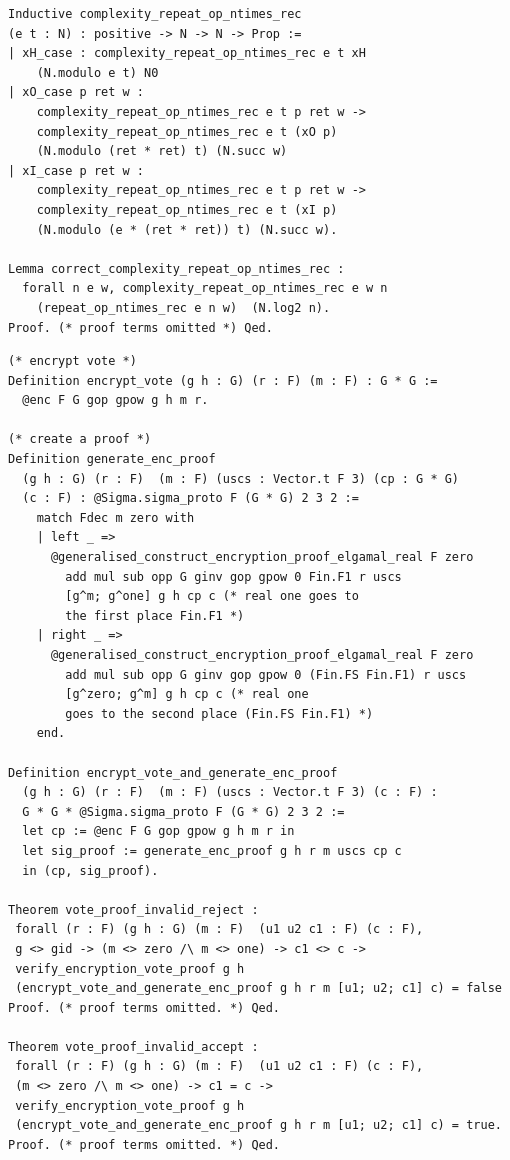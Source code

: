 \documentclass[sigconf,anonymous,review]{acmart}
\begin{document}
\begin{lstlisting}[frame=single, language=Coq, caption={Extractor Complexity},
  label={extractor_complex},captionpos=t, basicstyle=\ttfamily\footnotesize,
  abovecaptionskip=-\medskipamount]
Inductive complexity_repeat_op_ntimes_rec 
(e t : N) : positive -> N -> N -> Prop :=
| xH_case : complexity_repeat_op_ntimes_rec e t xH 
    (N.modulo e t) N0
| xO_case p ret w : 
    complexity_repeat_op_ntimes_rec e t p ret w ->
    complexity_repeat_op_ntimes_rec e t (xO p) 
    (N.modulo (ret * ret) t) (N.succ w)
| xI_case p ret w : 
    complexity_repeat_op_ntimes_rec e t p ret w ->
    complexity_repeat_op_ntimes_rec e t (xI p) 
    (N.modulo (e * (ret * ret)) t) (N.succ w).

Lemma correct_complexity_repeat_op_ntimes_rec : 
  forall n e w, complexity_repeat_op_ntimes_rec e w n 
    (repeat_op_ntimes_rec e n w)  (N.log2 n).
Proof. (* proof terms omitted *) Qed.
\end{lstlisting}

\begin{lstlisting}[frame=single, language=Coq, caption={Frontend Functions},
  label={frontend_fun},captionpos=t, basicstyle=\ttfamily\footnotesize,
  abovecaptionskip=-\medskipamount]
(* encrypt vote *)
Definition encrypt_vote (g h : G) (r : F) (m : F) : G * G :=
  @enc F G gop gpow g h m r.

(* create a proof *)
Definition generate_enc_proof 
  (g h : G) (r : F)  (m : F) (uscs : Vector.t F 3) (cp : G * G) 
  (c : F) : @Sigma.sigma_proto F (G * G) 2 3 2 :=
    match Fdec m zero with 
    | left _ => 
      @generalised_construct_encryption_proof_elgamal_real F zero 
        add mul sub opp G ginv gop gpow 0 Fin.F1 r uscs 
        [g^m; g^one] g h cp c (* real one goes to 
        the first place Fin.F1 *)
    | right _ =>  
      @generalised_construct_encryption_proof_elgamal_real F zero 
        add mul sub opp G ginv gop gpow 0 (Fin.FS Fin.F1) r uscs 
        [g^zero; g^m] g h cp c (* real one 
        goes to the second place (Fin.FS Fin.F1) *)
    end.

Definition encrypt_vote_and_generate_enc_proof 
  (g h : G) (r : F)  (m : F) (uscs : Vector.t F 3) (c : F) : 
  G * G * @Sigma.sigma_proto F (G * G) 2 3 2 := 
  let cp := @enc F G gop gpow g h m r in
  let sig_proof := generate_enc_proof g h r m uscs cp c
  in (cp, sig_proof).

Theorem vote_proof_invalid_reject : 
 forall (r : F) (g h : G) (m : F)  (u1 u2 c1 : F) (c : F),
 g <> gid -> (m <> zero /\ m <> one) -> c1 <> c ->
 verify_encryption_vote_proof g h 
 (encrypt_vote_and_generate_enc_proof g h r m [u1; u2; c1] c) = false
Proof. (* proof terms omitted. *) Qed. 

Theorem vote_proof_invalid_accept :
 forall (r : F) (g h : G) (m : F)  (u1 u2 c1 : F) (c : F),
 (m <> zero /\ m <> one) -> c1 = c ->
 verify_encryption_vote_proof g h 
 (encrypt_vote_and_generate_enc_proof g h r m [u1; u2; c1] c) = true.
Proof. (* proof terms omitted. *) Qed.
\end{lstlisting}
\end{document}
